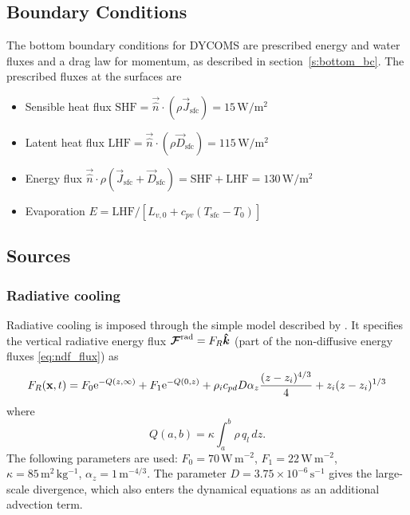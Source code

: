 \documentclass{report}
\begin{document}
\subsection{Boundary Conditions}

The bottom boundary conditions for DYCOMS are prescribed energy and water fluxes and a drag law for momentum, as described in section~\ref{s:bottom_bc}. The prescribed fluxes at the surfaces are
\begin{itemize} 
\item Sensible heat flux $\mathrm{SHF} = \vec{\hat n} \cdot (\rho \vec{J}_{\mathrm{sfc}}) = 15\,\mathrm{W/m^2}$
\item Latent heat flux $\mathrm{LHF} = \vec{\hat n} \cdot (\rho \vec{D}_{\mathrm{sfc}}) = 115\,\mathrm{W/m^2}$
\item Energy flux $\vec{\hat n} \cdot \rho (\vec{J}_{\mathrm{sfc}} + \vec{D}_{\mathrm{sfc}}) = \mathrm{SHF + LHF} = 130\,\mathrm{W/m^2}$
\item Evaporation $E = \mathrm{LHF}/[L_{v,0} + c_{pv}(T_\mathrm{sfc} - T_0)]$
\end{itemize}

\subsection{Sources}

\subsubsection{Radiative cooling}
Radiative cooling is imposed through the simple model described by \cite{Stevens05a}. It specifies the vertical radiative energy flux $\boldsymbol{{\mathcal{F}}}^{\mathrm{rad}} = F_R \boldsymbol{{\hat k}}$ (part of the non-diffusive energy fluxes \eqref{eq:ndf_flux}) as
\begin{equation}
    \label{e:radiativeStevens05}
    F_{R}({\bf x}, t) = F_0{\rm e}^{-Q(z,\infty)} +
    F_1{\rm e}^{-Q(0, z)} +
    \rho_i c_{pd} D \alpha_z\frac{(z-z_i)^{4/3}}{4} + z_i(z - z_i)^{1/3}
\end{equation}
where 
\begin{equation}
    Q(a,b) = \kappa\int_{a}^{b}\rho\,q_l\,dz.
\end{equation}
The following parameters are used:
$F_0=70\,\mathrm{W\,m^{-2}}$, $F_1=22\,\mathrm{W\,m^{-2}}$, $\kappa=85\,\mathrm{m^2\,kg^{-1}}$, $\alpha_z=1\,\mathrm{m^{-4/3}}$. The parameter $D=3.75\times 10^{-6}\,\mathrm{s^{-1}}$ gives the large-scale divergence, which also enters the dynamical equations as an additional advection term.  
\end{document}
